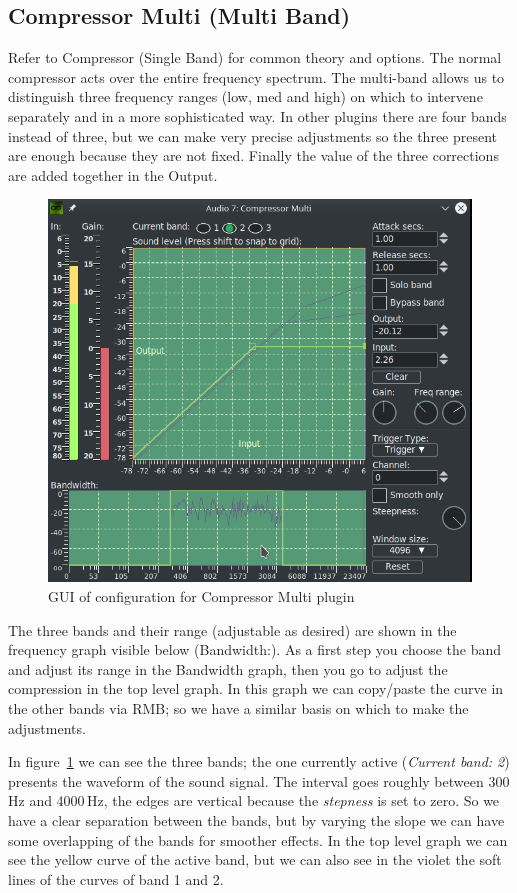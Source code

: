\subsection{Compressor Multi (Multi Band)}%
\label{sub:compressor_multi}

Refer to Compressor (Single Band) for common theory and options.
The normal compressor acts over the entire frequency spectrum. The multi-band allows us to distinguish three frequency ranges (low, med and high) on which to intervene separately and in a more sophisticated way. In other plugins there are four bands instead of three, but we can make very precise adjustments so the three present are enough because they are not fixed. Finally the value of the three corrections are added together in the Output.

\begin{figure}[htpb]
	\centering
	\includegraphics[width=0.7\linewidth]{images/compressorM.png}
	\caption{GUI of configuration for Compressor Multi plugin}
	\label{fig:compressorM}
\end{figure}

The three bands and their range (adjustable as desired) are shown in the frequency graph visible below (Bandwidth:).
As a first step you choose the band and adjust its range in the Bandwidth graph, then you go to adjust the compression in the top level graph. In this graph we can copy/paste the curve in the other bands via RMB; so we have a similar basis on which to make the adjustments.

In figure~\ref{fig:compressorM} we can see the three bands; the one currently active (\textit{Current band: 2}) presents the waveform of the sound signal. The interval goes roughly between 300\,Hz and 4000\,Hz, the edges are vertical because the \textit{stepness} is set to zero. So we have a clear separation between the bands, but by varying the slope we can have some overlapping of the bands for smoother effects. In the top level graph we can see the yellow curve of the active band, but we can also see in the violet the soft lines of the curves of band 1 and 2.

